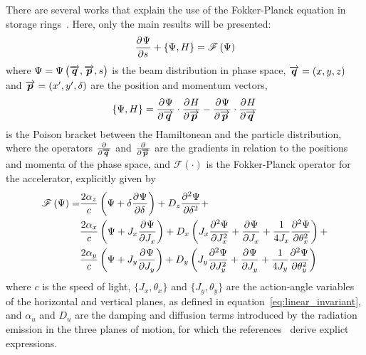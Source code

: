     There are several works that explain the use of the Fokker-Planck equation in storage rings~\cite{Lindberg2016,Suzuki1983,Suzuki1986,LeeBook,Wiedemann}. Here, only the main results will be presented:
    \begin{align}\label{eq:fokker_planck_equation}
        \derpar{\Psi}{s} + \poison{\Psi, H} = \mathscr{F}\funcof{\Psi}
    \end{align}
    where $\Psi = \Psi\funcof{\vect{q},\vect{p}, s}$ is the beam distribution in phase space, $\vect{q}=(x,y,z)$ and $\vect{p}=(x',y',\delta)$ are the position and momentum vectors,
    \begin{align}
        \poison{\Psi, H} = \derpar{\Psi}{\vect{q}}\cdot\derpar{H}{\vect{p}} -
                           \derpar{\Psi}{\vect{p}}\cdot\derpar{H}{\vect{q}}
    \end{align}
    is the Poison bracket between the Hamiltonean and the particle distribution, where the operators $\derpar{}{\vect{q}}$ and $\derpar{}{\vect{p}}$ are the gradients in relation to the positions and momenta of the phase space, and $\mathscr{F}(\cdot)$ is the Fokker-Planck operator for the accelerator, explicitly given by~\cite[eq. 33]{Lindberg2016}
    \begin{align}\nonumber
        \mathscr{F}\funcof{\Psi} = & \frac{2\alpha_z}{c}\funcof{
                                            \Psi + \delta\derpar{\Psi}{\delta}
                                      } + D_z \derpar[2]{\Psi}{\delta} + \\\nonumber
                                   & \frac{2\alpha_x}{c}\funcof{
                                         \Psi + J_x\derpar{\Psi}{J_x}
                                     } + D_x \funcof{J_x\derpar[2]{\Psi}{J_x} +
                                                 \derpar{\Psi}{J_x} +
                                                 \frac{1}{4J_x}\derpar[2]{\Psi}{\theta_x}
                                          } + \\
                                   & \frac{2\alpha_y}{c}\funcof{
                                        \Psi + J_y\derpar{\Psi}{J_y}
                                     } + D_y \funcof{J_y\derpar[2]{\Psi}{J_y} +
                                                 \derpar{\Psi}{J_y} +
                                                 \frac{1}{4J_y}\derpar[2]{\Psi}{\theta_y}
                                         }
    \end{align}
    where $c$ is the speed of light, $\{J_x, \theta_x\}$ and $\{J_y, \theta_y\}$ are the action-angle variables of the horizontal and vertical planes, as defined in equation~\eqref{eq:linear_invariant}, and $\alpha_u$ and $D_u$ are the damping and diffusion terms introduced by the radiation emission in the three planes of motion, for which the references~\cite{Sands1969Int,WiedemannBook} derive explict expressions.

